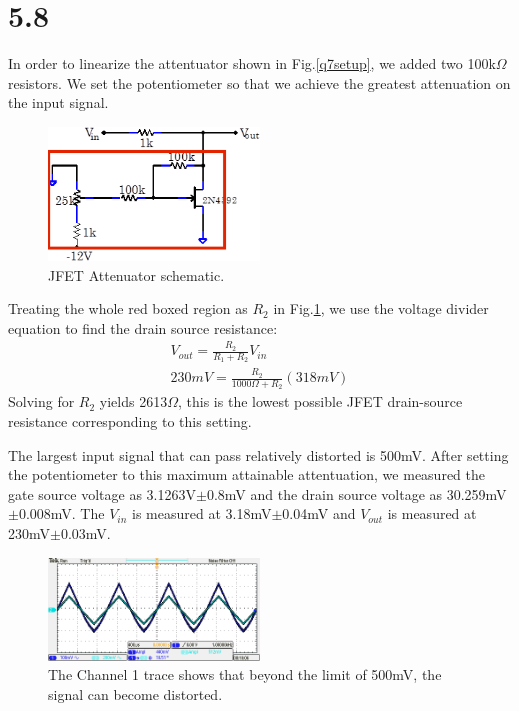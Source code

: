 \documentclass[authoryear, 12pt,5p, times]{elsarticle}
\begin{document}
  \section*{5.8}
  In order to linearize the attentuator shown in Fig.\ref{q7setup}, we added two 100k$\Omega$ resistors.  We set the potentiometer so that we achieve the greatest attenuation on the input signal.   
  \begin{figure}[h!]
 \centering
 \includegraphics[width=0.5\textwidth]{figure/q8setup}
\caption{JFET Attenuator schematic.}
\label{q8setup}
 \end{figure}
Treating the whole red boxed region as $R_2$ in Fig.\ref{q8setup}, we use the voltage divider equation to find the drain source resistance: 
\begin{align*}
V_{out} = \frac{R_2}{R_1+R_2}V_{in}
\\230mV = \frac{R_2}{1000\Omega+R_2}(318mV)
\label{voltage_divider}
\end{align*}
Solving for $R_2$ yields 2613$\Omega$, this is the lowest possible JFET drain-source resistance corresponding to this setting.

\par The largest input signal that can pass relatively distorted is 500mV. After setting the potentiometer to this maximum attainable attentuation, we measured the gate source voltage as 3.1263V$\pm$0.8mV and the drain source voltage as 30.259mV$\pm$0.008mV. The $V_{in}$ is measured at 3.18mV$\pm$0.04mV and $V_{out}$ is measured at 230mV$\pm$0.03mV.
  \begin{figure}[h!]
 \centering
 \includegraphics[width=0.5\textwidth]{figure/q8trace}
\caption{The Channel 1 trace shows that beyond the limit of 500mV, the signal can become distorted.}
\label{q8trace}
 \end{figure}
\end{document}
